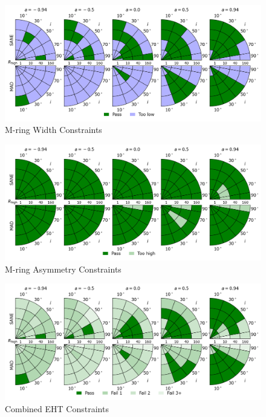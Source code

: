 \begin{figure}
  \centering
  \includegraphics[width=\textwidth]{./figures/Mring_w_Constraints.png}
  \caption{M-ring Width Constraints}
  \label{fig:mring_width_pizza}
\end{figure}
\begin{figure}
  \centering
  \includegraphics[width=\textwidth]{./figures/Mring_f1_Constraints.png}
  \caption{M-ring Asymmetry Constraints}
  \label{fig:mring_asymm_pizza}
\end{figure}
\begin{figure}
  \centering
  \includegraphics[width=\textwidth]{./figures/Interferometric_Constraints.png}
  \caption{Combined EHT Constraints}
  \label{fig:eht_comb_pizza}
\end{figure}

